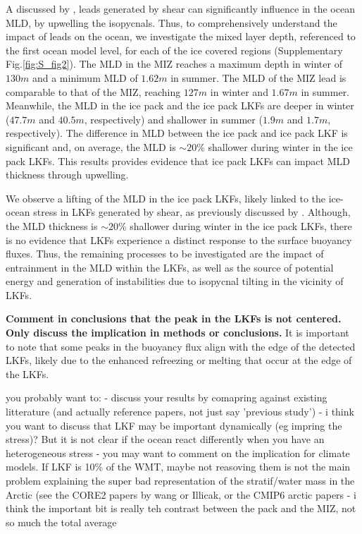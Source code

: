 \documentclass[draft]{agujournal2019}
\begin{document}
A discussed by \citealt{McPhee_LKF_2005}, leads generated by shear can significantly influence in the ocean MLD, by upwelling the isopycnals. Thus, to comprehensively understand the impact of leads on the ocean, we investigate the mixed layer depth, referenced to the first ocean model level, for each of the ice covered regions (Supplementary Fig.\ref{fig:S_fig2}). The MLD in the MIZ reaches a maximum depth in winter of $130 m$ and a minimum MLD of $1.62 m$ in summer. The MLD of the MIZ lead is comparable to that of the MIZ, reaching $127 m$ in winter and $1.67 m$ in summer. Meanwhile, the MLD in the ice pack and the ice pack LKFs are deeper in winter ($47.7 m$ and $40.5 m$, respectively) and shallower in summer ($1.9 m$ and $1.7 m$, respectively). The difference in MLD between the ice pack and ice pack LKF is significant and, on average, the MLD is $\sim 20\%$ shallower during winter in the ice pack LKFs. This results provides evidence that ice pack LKFs can impact MLD thickness through upwelling. 

We observe a lifting of the MLD in the ice pack LKFs, likely linked to the ice-ocean stress in LKFs generated by shear, as previously discussed by \citealt{McPhee_LKF_2005}. Although, the MLD thickness is $\sim 20\%$ shallower during winter in the ice pack LKFs, there is no evidence that LKFs experience a distinct response to the surface buoyancy fluxes. Thus, the remaining processes to be investigated are the impact of entrainment in the MLD within the LKFs, as well as the source of potential energy and generation of instabilities due to isopycnal tilting in the vicinity of LKFs.

\textbf{Comment in conclusions that the peak in the LKFs is not centered. Only discuss the implication in methods or conclusions.}
It is important to note that some peaks in the buoyancy flux align with the edge of the detected LKFs, likely due to the enhanced refreezing or melting that occur at the edge of the LKFs. 

you probably want to:
- discuss your results by comapring against existing litterature (and actually reference papers, not just say 'previous study')
- i think you want to discuss that LKF  may be important dynamically (eg impring the stress)? But it is not clear if the ocean react differently when you have an heterogeneous stress
- you may want to comment on the implication for climate models. If LKF is 10\% of the WMT, maybe not reasoving them is not the main problem explaining the super bad representation of the stratif/water mass in the Arctic (see the CORE2 papers by wang or Illicak, or the CMIP6 arctic papers
- i think the important bit is really teh contrast between the pack and the MIZ, not so much the total average
\end{document}
